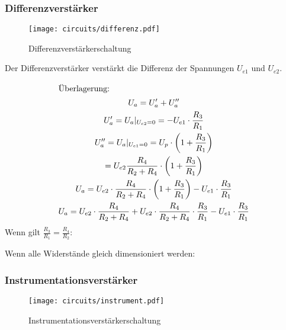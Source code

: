 \subsubsection{Differenzverstärker}

\begin{figure}[H]
  \begin{center}
    \texttt{[image: circuits/differenz.pdf]}
  \end{center}
  \caption{Differenzverstärkerschaltung}
\end{figure}

Der Differenzverstärker verstärkt die Differenz der Spannungen $U_{e1}$ und $U_{e2}$.

\begin{gather*}
  \intertext{Überlagerung:}
  U_a = U_a' + U_a''\\
  U_a' = U_a|_{U_{e2} = 0} = - U_{e1} \cdot \frac{R_3}{R_1}\\
  U_a'' = U_a|_{U_{e1} = 0} = U_p \cdot \left(1+\frac{R_3}{R_1}\right)\\
  = U_{e2}  \frac{R_4}{R_2 + R_4} \cdot \left(1+\frac{R_3}{R_1}\right)\\
  U_a = U_{e2}  \cdot \frac{R_4}{R_2 + R_4} \cdot \left(1+\frac{R_3}{R_1}\right) -
  U_{e1} \cdot \frac{R_3}{R_1}\\
  U_a = U_{e2}  \cdot \frac{R_4}{R_2 + R_4} + U_{e2} \cdot \frac{R_4}{R_2 + R_4}
  \cdot \frac{R_3}{R_1} - U_{e1} \cdot \frac{R_3}{R_1}
\end{gather*}
\noindent Wenn gilt $\frac{R_3}{R_1} = \frac{R_4}{R_2}:$

\noindent Wenn alle Widerstände gleich dimensioniert werden:


\subsubsection{Instrumentationsverstärker}

\begin{figure}[H]
  \begin{center}
    \texttt{[image: circuits/instrument.pdf]}
  \end{center}
  \caption{Instrumentationsverstärkerschaltung}
\end{figure}

